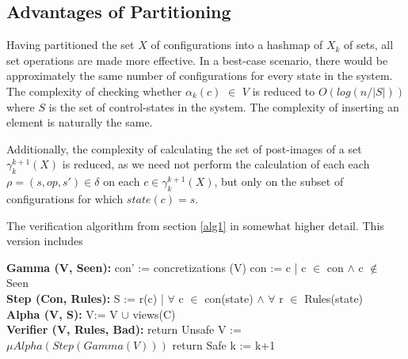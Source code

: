 \subsection{Advantages of Partitioning}
Having partitioned the set $X$ of configurations into a hashmap of $X_k$ of sets, all set operations are made more effective. In a best-case scenario, there would be approximately the same number of configurations for every state in the system. The complexity of checking whether $\alpha_k(c)$ $\in$ $V$ is reduced to $O(log (n/|S|))$ where $S$ is the set of control-states in the system. The complexity of inserting an element is naturally the same.

Additionally, the complexity of calculating the set of post-images of a set $\gamma_k^{k+1}(X)$ is reduced, as we need not perform the calculation of each each $\rho = (s, op, s') \in \delta$ on each $c \in \gamma_k^{k+1}(X)$, but only on the subset of configurations for which $state(c) = s$.


\begin{algorithm}
  \caption{The verification algorithm from section \ref{alg1} in somewhat higher detail. This version includes }\label{euclid}
  \begin{algorithmic}[1]
    \State \textbf{Gamma (V, Seen):}
    \State \hspace{6 mm} con' := concretizations (V)
    \State \hspace{6 mm} con  := c | c $\in$ con $\land$ c $\notin$ Seen
    \\
    \State \textbf{Step (Con, Rules):}
    \State \hspace{6 mm} S := r(c) | $\forall$ c $\in$ con(state) $\land$ $\forall$ r $\in$ Rules(state)
    \EndFor
    \\
    \State \textbf{Alpha (V, S):}
    \State \hspace{6 mm} V:= V $\cup$ views(C)
    \\
    \State \textbf{Verifier (V, Rules, Bad):}
        \State return Unsafe
        \EndIf
        \State V := $\mu Alpha(Step(Gamma(V)))$
        \State return Safe
        \EndIf
        \State k := k+1
      \EndFor
\end{algorithmic}
\end{algorithm}



\newpage
